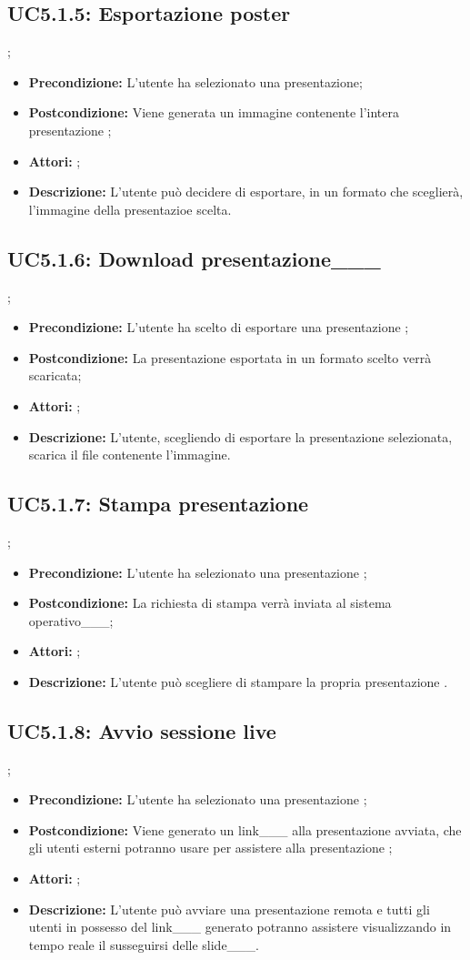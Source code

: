 \subsection{ UC5.1.5: Esportazione poster}
;
\begin{itemize}
	\item \textbf{Precondizione:} L'utente ha selezionato una presentazione;
	\item \textbf{Postcondizione:} Viene generata un immagine contenente l'intera presentazione ;
	\item \textbf{Attori:} ;
	\item \textbf{Descrizione:} L'utente può decidere di esportare, in un formato che sceglierà, l'immagine della presentazioe scelta.
\end{itemize}
\subsection{ UC5.1.6: Download presentazione___}
;
\begin{itemize}
	\item \textbf{Precondizione:} L'utente ha scelto di esportare una presentazione ;
	\item \textbf{Postcondizione:} La presentazione esportata in un formato scelto verrà scaricata;
	\item \textbf{Attori:} ;
	\item \textbf{Descrizione:} L'utente, scegliendo di esportare la presentazione selezionata, scarica il file contenente l'immagine.
\end{itemize}
\subsection{ UC5.1.7: Stampa presentazione }
;
\begin{itemize}
	\item \textbf{Precondizione:} L'utente ha selezionato una presentazione ;
	\item \textbf{Postcondizione:} La richiesta di stampa verrà inviata al sistema operativo___;
	\item \textbf{Attori:} ;
	\item \textbf{Descrizione:} L'utente può scegliere di stampare la propria presentazione .
\end{itemize}
\subsection{ UC5.1.8: Avvio sessione live}
;
\begin{itemize}
	\item \textbf{Precondizione:} L'utente ha selezionato una presentazione ;
	\item \textbf{Postcondizione:} Viene generato un link___ alla presentazione avviata, che gli utenti esterni potranno usare per assistere alla presentazione ;
	\item \textbf{Attori:} ;
	\item \textbf{Descrizione:} L'utente può avviare una presentazione remota e tutti gli utenti in possesso del link___ generato potranno assistere visualizzando in tempo reale il susseguirsi delle slide___.
\end{itemize}
